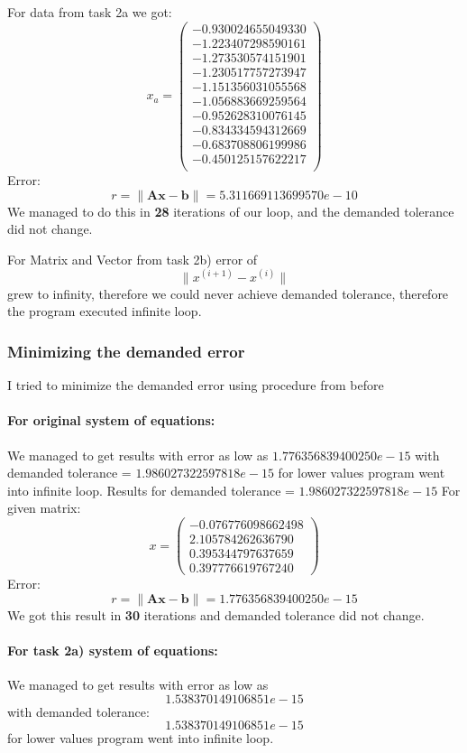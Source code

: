 \documentclass[12pt]{report}
\begin{document}
For data from task 2a we got: \\
\[ x_a = \left( \begin{array}{cc}
-0.930024655049330 \\
-1.223407298590161 \\
-1.273530574151901 \\
-1.230517757273947 \\
-1.151356031055568 \\
-1.056883669259564 \\
-0.952628310076145 \\
-0.834334594312669 \\
-0.683708806199986 \\
-0.450125157622217 \\
\end{array} \right)
\]
Error:
\[ r = \| \mathbf{A}\mathbf{x} - \mathbf{b}\| = 5.311669113699570e-10 \]
We managed to do this in \textbf{28} iterations of our loop, and the demanded tolerance did not change.

For Matrix and Vector from task 2b) error of
\[ \| x^{(i+1)} - x^{(i)} \| \]
grew to infinity, therefore we could never achieve demanded tolerance, therefore the program executed infinite loop.

\subsubsection{Minimizing the demanded error}
I tried to minimize the demanded error using procedure from before
\paragraph{For original system of equations:}
We managed to get results with error as low as $1.776356839400250e-15$ with demanded tolerance = $ 1.986027322597818e-15 $ for lower values program went into infinite loop.
Results for demanded tolerance = $1.986027322597818e-15$
For given matrix:
\[ x = \left( \begin{array}{cc}
  -0.076776098662498 \\
   2.105784262636790 \\
   0.395344797637659 \\
   0.397776619767240
\end{array} \right)
\]
Error:
\[ r = \| \mathbf{A}\mathbf{x} - \mathbf{b}\| = 1.776356839400250e-15 \]
We got this result in \textbf{30} iterations and demanded tolerance did not change.

\newpage
\paragraph{For task 2a) system of equations:}
We managed to get results with error as low as
\[ 1.538370149106851e-15 \] with demanded tolerance:
\[ 1.538370149106851e-15 \]
for lower values program went into infinite loop.
\end{document}
